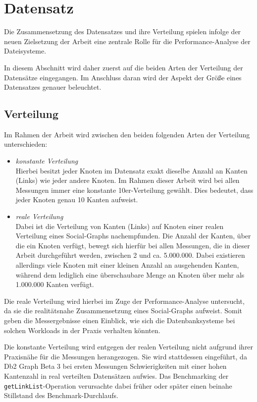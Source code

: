 \section{Datensatz}
\label{analyse:datensatz}
Die Zusammensetzung des Datensatzes und ihre Verteilung spielen infolge der neuen Zielsetzung der Arbeit eine zentrale Rolle für die Performance-Analyse der Dateisysteme.

In diesem Abschnitt wird daher zuerst auf die beiden Arten der Verteilung der Datensätze eingegangen. Im Anschluss daran wird der Aspekt der Größe eines Datensatzes genauer beleuchtet.

\subsection{Verteilung}
Im Rahmen der Arbeit wird zwischen den beiden folgenden Arten der Verteilung unterschieden:
\begin{itemize}
    \item \textit{konstante Verteilung}\\
    Hierbei besitzt jeder Knoten im Datensatz exakt dieselbe Anzahl an Kanten (Links) wie jeder andere Knoten. Im Rahmen dieser Arbeit wird bei allen Messungen immer eine konstante 10er-Verteilung gewählt. Dies bedeutet, dass jeder Knoten genau 10 Kanten aufweist. 
    \item \textit{reale Verteilung}\\
    Dabei ist die Verteilung von Kanten (Links) auf Knoten einer realen Verteilung eines Social-Graphs nachempfunden. Die Anzahl der Kanten, über die ein Knoten verfügt, bewegt sich hierfür bei allen Messungen, die in dieser Arbeit durchgeführt werden, zwischen 2 und ca. 5.000.000. Dabei existieren allerdings viele Knoten mit einer kleinen Anzahl an ausgehenden Kanten, während dem lediglich eine überschaubare Menge an Knoten über mehr als 1.000.000 Kanten verfügt.
\end{itemize}
Die reale Verteilung wird hierbei im Zuge der Performance-Analyse untersucht, da sie die realitätsnahe Zusammensetzung eines Social-Graphs aufweist. Somit geben die Messergebnisse einen Einblick, wie sich die Datenbanksysteme bei solchen Workloads in der Praxis verhalten könnten.

Die konstante Verteilung wird entgegen der realen Verteilung nicht aufgrund ihrer Praxisnähe für die Messungen herangezogen. Sie wird stattdessen eingeführt, da Db2 Graph Beta 3 bei ersten Messungen Schwierigkeiten mit einer hohen Kantenzahl in real verteilten Datensätzen aufwies. Das Benchmarking der \texttt{getLinkList}-Ope\-ra\-ti\-on verursachte dabei früher oder später einen beinahe Stillstand des Benchmark-Durchlaufs. 

